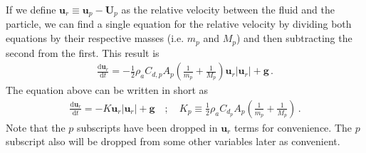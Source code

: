 If we define $\mathbf{u}_r \equiv \mathbf{u}_p - \mathbf{U}_p$ as the relative velocity between the fluid and the particle, we can find a single equation for the relative velocity by dividing both equations by their respective masses (i.e. $m_p$ and $M_p$) and then subtracting the second from the first. This result is
\begin{align}
    \frac{\text{d} \mathbf{u}_r}{\text{d} t} = -\frac{1}{2} \rho_a C_{d,p} A_p \left(\frac{1}{m_p} + \frac{1}{M_p} \right) \mathbf{u}_r |\mathbf{u}_r| + \mathbf{g} \,.
\end{align}
The equation above can be written in short as
\begin{align}
    \frac{\text{d} \mathbf{u}_r}{\text{d} t} = -K \mathbf{u}_r |\mathbf{u}_r| + \mathbf{g} \quad ; \quad K_p \equiv \frac{1}{2} \rho_a C_{d_p} A_p \left(\frac{1}{m_p} + \frac{1}{M_p} \right) \,.
\end{align}
Note that the $p$ subscripts have been dropped in $\mathbf{u}_r$ terms for convenience. The $p$ subscript also will be dropped from some other variables later as convenient.



